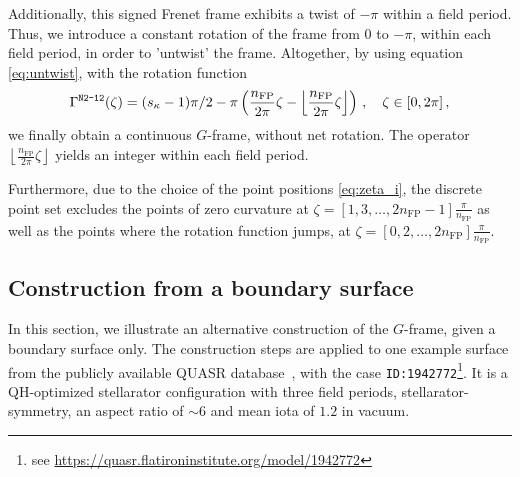 \documentclass[12pt]{iopart}
\newcommand\hladdedrev[1]{#1} %
\newcommand\hlchangedrev[1]{#1} %
\newcommand\GFF{$G$-frame}
\newcommand\nfp{n_\textrm{FP}}
\begin{document}
\hlchangedrev{Additionally, this signed Frenet frame exhibits a twist of $-\pi$ within a field period. Thus, we introduce a constant rotation of the frame from $0$ to $-\pi$, within each field period, in order to 'untwist' the frame.} Altogether, by using equation \eqref{eq:untwist}, with the rotation function
\begin{equation}
    \Gamma^\text{\texttt{N2-12}}(\zeta) = (s_\kappa-1)\pi/2 - \pi\left(\frac{\nfp}{2\pi}\zeta  - \left\lfloor\frac{\nfp}{2\pi}\zeta\right\rfloor \right) \,,\quad \zeta\in[0,2\pi]\,,
\end{equation}
\hladdedrev{we finally obtain a continuous \GFF{}, without net rotation. The operator $\left\lfloor\frac{\nfp}{2\pi}\zeta\right\rfloor$ yields an integer within each field period.}
 
Furthermore, due to the choice of the point positions \eqref{eq:zeta_i}, the discrete point set excludes the points of zero curvature at $\zeta =[1,3,\dots,2\nfp-1]\frac{\pi}{\nfp} $ as well as the points where the rotation function jumps, at $\zeta =[0,2,\dots,2\nfp]\frac{\pi}{\nfp}$.

\subsection{\hladdedrev{Construction from a boundary surface}\label{sec:quasr}}

\hladdedrev{In this section, we illustrate an alternative construction of the \GFF{}, given a boundary surface only. The construction steps are applied to one example surface from the publicly available QUASR database~\cite{Giuliani_2024_quasr}, with the case \texttt{ID:1942772}\footnote{see \url{https://quasr.flatironinstitute.org/model/1942772}}. It is a QH-optimized stellarator configuration with three field periods, stellarator-symmetry, an aspect ratio of $\sim6$ and mean iota of $1.2$ in vacuum.}
\end{document}
